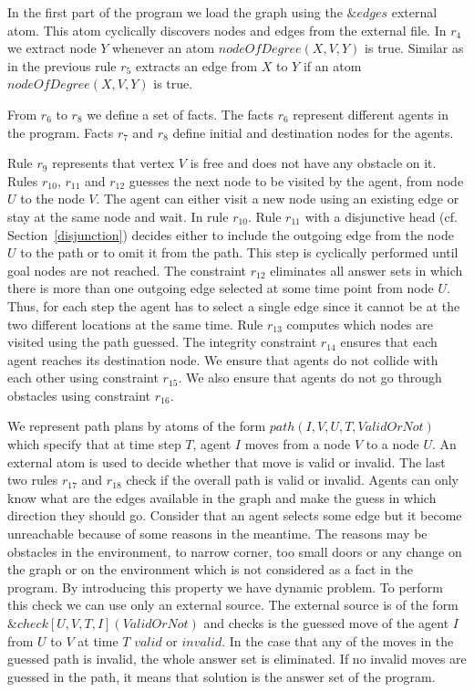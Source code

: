 \documentclass[a4paper, titlepage]{article}
\newcommand{\ext}[3]{\ensuremath{\&{#1}[#2](#3)}}
\begin{document}
In the first part of the program we load the graph using 
the $\&edges$ external atom. This atom cyclically discovers 
nodes and edges from the external file. In $r_4$ we 
extract node $Y$ whenever an atom $\mathit{nodeOfDegree(X, 
V, Y)}$ is true. Similar as in the previous rule $r_5$ extracts an edge from $X$ to $Y$ if an atom 
$\mathit{nodeOfDegree(X, V,Y)}$ is true. 

From $r_6$ to $r_8$ we define a set of facts. 
The facts $r_6$ represent different agents in the program. 
Facts $r_{7}$ and $r_{8}$ define initial and 
destination nodes for the agents.  

Rule $r_{9}$ 
represents that vertex $V$ is free and does not have any 
obstacle on it. Rules $r_{10}$, $r_{11}$ and 
$r_{12}$ guesses the next node to be visited by the agent, from 
node $U$ to the node $V$. The agent can either visit a new node 
using an existing edge or stay at the same node and wait. 
In rule $r_{10}$. Rule $r_{11}$ 
with a disjunctive head (cf. Section~\ref{disjunction}) decides either to include the outgoing edge 
from the node $U$ to the path or to omit it from the path. 
This step is cyclically performed until goal nodes are not 
reached. The constraint $r_{12}$ eliminates all answer sets in which there is more than one outgoing edge 
selected at some time point from node $U$. Thus, for each step 
the agent has to select a single edge since it cannot be at the 
two different locations at the same time. Rule $r_{13}$ computes which nodes are visited using the path 
guessed. The integrity constraint $r_{14}$ ensures that 
each agent reaches its destination node. We ensure that 
agents do not collide with each other using constraint 
$r_{15}$. We also ensure that agents do not go through 
obstacles using constraint $r_{16}$. 

We represent path plans by atoms of the form 
$\mathit{path(I, V, U, T, ValidOrNot)}$ which specify that 
at time step $T$, agent $I$ moves from a node $V$ to a 
node $U$. An external atom is used to decide whether that move is valid or invalid. The last 
two rules $r_{17}$ and $r_{18}$ check if the overall path is valid or invalid. Agents can only know what are the edges 
available in the graph and make the guess in which 
direction they should go. Consider that an agent selects 
some 
edge but it become unreachable because of some reasons in the meantime. 
The reasons may be obstacles in the environment, to narrow corner, too small doors or any change on 
the graph or on the environment which is not considered as 
a fact in the program. By introducing this property we have dynamic problem. To perform this check we 
can use only an external source. The external source is of the 
form \ext{check}{U,V,T,I}{ValidOrNot} and checks is the 
guessed move of the agent $I$ from $U$ to $V$ at time $T$ 
$\mathit{valid}$ or $\mathit{invalid}$. In the case that 
any of the moves in the guessed path is invalid, the whole 
answer set is eliminated. If no invalid moves are guessed in the path, it means that solution is the answer set of the program.            
\end{document}

